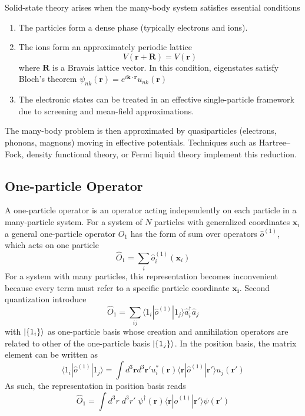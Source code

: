 \documentclass[../../../main.tex]{subfiles}
\begin{document}
Solid-state theory arises when the many-body system satisfies essential conditions
\begin{enumerate}
  \item The particles form a dense phase (typically electrons and ions).
  \item The ions form an approximately periodic lattice
        \begin{equation*}
          V(\mathbf{r} + \mathbf{R}) = V(\mathbf{r})
        \end{equation*}
        where \(\mathbf{R}\) is a Bravais lattice vector. In this condition, eigenstates satisfy Bloch's theorem $\psi_{nk}(\mathbf{r}) = e^{i \mathbf{k} \cdot \mathbf{r}} u_{nk}(\mathbf{r})$
  \item The electronic states can be treated in an effective single-particle framework due to screening and mean-field approximations.
\end{enumerate}

The many-body problem is then approximated by quasiparticles (electrons, phonons, magnons) moving in effective potentials.
Techniques such as Hartree–Fock, density functional theory, or Fermi liquid theory implement this reduction.

\subsection{One-particle Operator}
A one-particle operator  is an operator acting independently on each particle in a many-particle system.
For a system of $N$ particles with generalized coordinates $\mathbf{x}_i$ a general one-particle operator $\hat{O}_1$ has the form of sum over operators $\hat{o } ^{(1)}$, which acts on one particle
\begin{equation*}
  \hat{O}_1 = \sum_{i } \hat{o } ^{(1)}_{i}(\mathbf{x}_i)
\end{equation*}
For a system with many particles, this representation becomes inconvenient because every term must refer to a specific particle coordinate $\mathbf{x_i}$.
Second quantization introduce
\begin{equation*}
  \hat{O}_1 = \sum_{ij} \langle 1_i | \hat{o } ^{(1)} | 1_j \rangle \hat{a}_i^\dagger \hat{a}_j
\end{equation*}
with $\ket{\left\{ 1_i \right\}  }$ as one-particle basis whose creation and annihilation operators are related to other of the one-particle basis $\ket{\left\{ 1_j \right\} }$.
In the position basis, the matrix element can be written as
\begin{equation*}
  \langle 1_i|\hat{o } ^{(1)}|1_j\rangle = \int d^3 \mathbf{r} d^3 \mathbf{r}' u^*_{i}(\mathbf{r}) \langle \mathbf{r}|\hat{o } ^{(1)}|\mathbf{r}'\rangle u_j(\mathbf{r}')
\end{equation*}
As such, the representation in position basis reads
\begin{equation*}
  \hat{O}_1
  = \int d^3r\;d^3r'\; \psi^\dagger(\mathbf{r}) \langle \mathbf{r}|\hat{o}^{(1)}|\mathbf{r}'\rangle \psi(\mathbf{r}')
\end{equation*}
\end{document}
